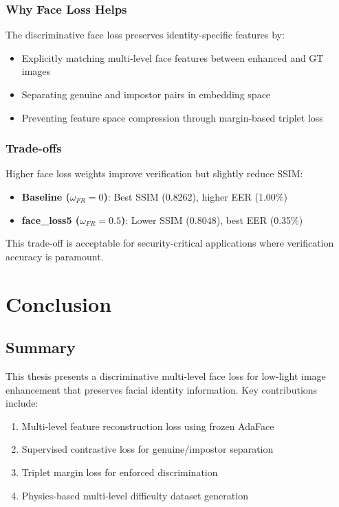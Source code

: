 \documentclass[12pt,a4paper]{article}
\begin{document}
\subsubsection{Why Face Loss Helps}

The discriminative face loss preserves identity-specific features by:
\begin{itemize}
    \item Explicitly matching multi-level face features between enhanced and GT images
    \item Separating genuine and impostor pairs in embedding space
    \item Preventing feature space compression through margin-based triplet loss
\end{itemize}

\subsubsection{Trade-offs}

Higher face loss weights improve verification but slightly reduce SSIM:
\begin{itemize}
    \item \textbf{Baseline ($\omega_{FR}=0$)}: Best SSIM (0.8262), higher EER (1.00\%)
    \item \textbf{face\_loss5 ($\omega_{FR}=0.5$)}: Lower SSIM (0.8048), best EER (0.35\%)
\end{itemize}

This trade-off is acceptable for security-critical applications where verification accuracy is paramount.

\section{Conclusion}

\subsection{Summary}

This thesis presents a discriminative multi-level face loss for low-light image enhancement that preserves facial identity information. Key contributions include:
\begin{enumerate}
    \item Multi-level feature reconstruction loss using frozen AdaFace
    \item Supervised contrastive loss for genuine/impostor separation
    \item Triplet margin loss for enforced discrimination
    \item Physics-based multi-level difficulty dataset generation
\end{enumerate}
\end{document}
